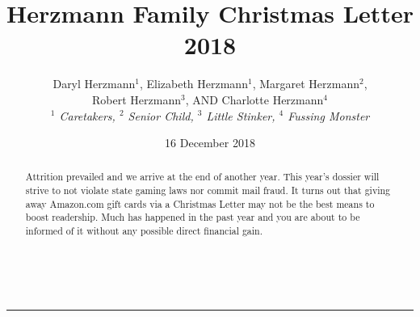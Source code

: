 \documentclass[letterpaper,11pt]{article}
\title{\vspace{-2.0cm}Herzmann Family Christmas Letter 2018}
\author{Daryl Herzmann${}^1$, Elizabeth Herzmann${}^1$, Margaret 
Herzmann${}^2$,\\
Robert Herzmann${}^3$, AND Charlotte Herzmann${}^4$ \\
\it{${}^1$ Caretakers},
\it{${}^2$ Senior Child},
\it{${}^3$ Little Stinker},
\it{${}^4$ Fussing Monster}}
\date{16 December 2018}
\newcommand{\Line}[0]{%
  \rule{0cm}{0cm}\\\hrule\rule{0cm}{0cm}%
}
\begin{document}
\maketitle
\vspace{-0.75cm}
\begin{abstract}
Attrition prevailed and we arrive at the end of another year. This year's
dossier will strive to not violate state gaming laws nor commit mail fraud. It
turns out that giving away Amazon.com gift cards via a Christmas Letter may not
be the best means to boost readership.  Much has happened in the past year and
you are about to be informed of it without any possible direct financial gain.
\end{abstract}

\vspace{-0.5cm}
\Line
\end{document}

